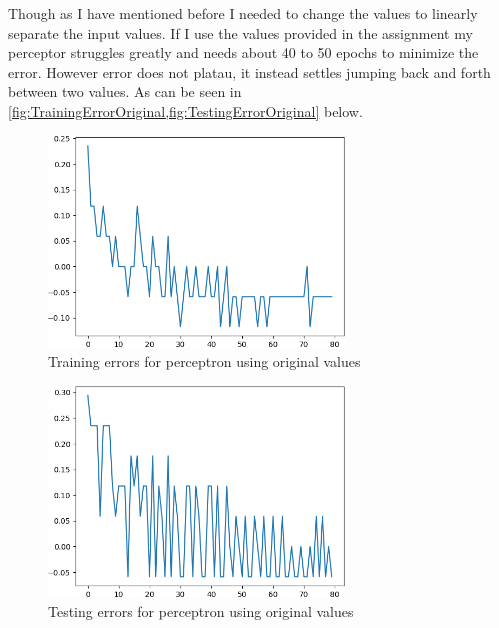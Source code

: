 \documentclass[a4,12pt]{extarticle}
\begin{document}
Though as I have mentioned before I needed to change the values to linearly separate the input values. If I use the values provided in the assignment my perceptor struggles greatly and needs about 40 to 50 epochs to minimize the error. However error does not platau, it instead settles jumping back and forth between two values. As can be seen in \cref{fig:TrainingErrorOriginal,fig:TestingErrorOriginal} below.
\begin{figure}[H]
  \centering
  \includegraphics[width=0.7\textwidth]{TrainingErrorOriginal}
  \caption{Training errors for perceptron using original values}
  \label{fig:TrainingErrorOriginal}
\end{figure}
\begin{figure}[H]
  \centering
  \includegraphics[width=0.7\textwidth]{TestingErrorOriginal}
  \caption{Testing errors for perceptron using original values}
  \label{fig:TestingErrorOriginal}
\end{figure}
\end{document}
